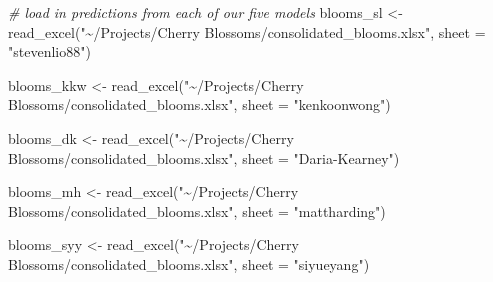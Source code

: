 \documentclass[
]{article}
\newenvironment{Shaded}{\begin{snugshade}}{\end{snugshade}}
\newcommand{\AttributeTok}[1]{\textcolor[rgb]{0.77,0.63,0.00}{#1}}
\newcommand{\CommentTok}[1]{\textcolor[rgb]{0.56,0.35,0.01}{\textit{#1}}}
\newcommand{\FunctionTok}[1]{\textcolor[rgb]{0.00,0.00,0.00}{#1}}
\newcommand{\NormalTok}[1]{#1}
\newcommand{\OtherTok}[1]{\textcolor[rgb]{0.56,0.35,0.01}{#1}}
\newcommand{\StringTok}[1]{\textcolor[rgb]{0.31,0.60,0.02}{#1}}
\begin{document}
\begin{Shaded}
\begin{Highlighting}[]
\CommentTok{\# load in predictions from each of our five models}
\NormalTok{blooms\_sl }\OtherTok{\textless{}{-}} \FunctionTok{read\_excel}\NormalTok{(}\StringTok{"\textasciitilde{}/Projects/Cherry Blossoms/consolidated\_blooms.xlsx"}\NormalTok{, }
    \AttributeTok{sheet =} \StringTok{"stevenlio88"}\NormalTok{)}

\NormalTok{blooms\_kkw }\OtherTok{\textless{}{-}} \FunctionTok{read\_excel}\NormalTok{(}\StringTok{"\textasciitilde{}/Projects/Cherry Blossoms/consolidated\_blooms.xlsx"}\NormalTok{, }
    \AttributeTok{sheet =} \StringTok{"kenkoonwong"}\NormalTok{)}

\NormalTok{blooms\_dk }\OtherTok{\textless{}{-}} \FunctionTok{read\_excel}\NormalTok{(}\StringTok{"\textasciitilde{}/Projects/Cherry Blossoms/consolidated\_blooms.xlsx"}\NormalTok{, }
    \AttributeTok{sheet =} \StringTok{"Daria{-}Kearney"}\NormalTok{)}

\NormalTok{blooms\_mh }\OtherTok{\textless{}{-}} \FunctionTok{read\_excel}\NormalTok{(}\StringTok{"\textasciitilde{}/Projects/Cherry Blossoms/consolidated\_blooms.xlsx"}\NormalTok{, }
    \AttributeTok{sheet =} \StringTok{"mattharding"}\NormalTok{)}

\NormalTok{blooms\_syy }\OtherTok{\textless{}{-}} \FunctionTok{read\_excel}\NormalTok{(}\StringTok{"\textasciitilde{}/Projects/Cherry Blossoms/consolidated\_blooms.xlsx"}\NormalTok{, }
    \AttributeTok{sheet =} \StringTok{"siyueyang"}\NormalTok{)}
\end{Highlighting}
\end{Shaded}
\end{document}
